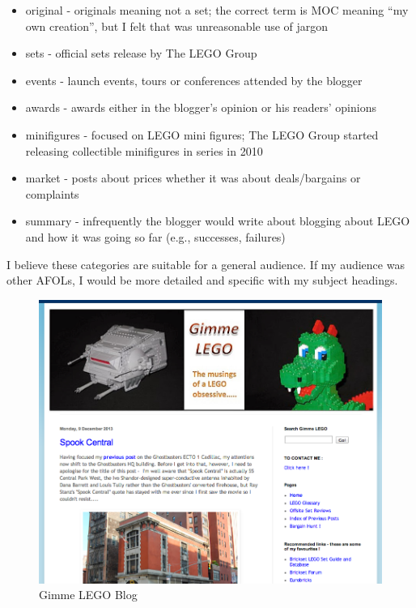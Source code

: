 \documentclass{article}
\begin{document}
\begin{itemize}
\item original - originals meaning not a set; the correct term is MOC meaning ``my own creation'', but I felt that was unreasonable use of jargon
\item sets - official sets release by The LEGO Group
\item events - launch events, tours or conferences attended by the blogger
\item awards - awards either in the blogger's opinion or his readers' opinions
\item minifigures - focused on LEGO mini figures; The LEGO Group started releasing collectible minifigures in series in 2010
\item market - posts about prices whether it was about deals/bargains or complaints
\item summary - infrequently the blogger would write about blogging about LEGO and how it was going so far (e.g., successes, failures)
\end{itemize}

I believe these categories are suitable for a general audience. If my audience was other AFOLs, I would be more detailed and specific with my subject headings. \\

\begin{figure}[H]
\centering
\includegraphics[scale=0.50]{files/gimmelegopage}
\caption{Gimme LEGO Blog}
\label{gimmelegopage}
\end{figure}
\end{document}
